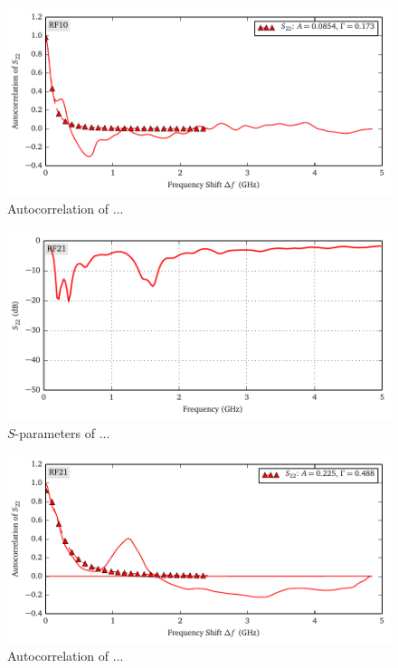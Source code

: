 \begin{figure}
 \centering
 \includegraphics{figs/active/RF10-autoCorrelation.pdf}
 \caption{Autocorrelation of ...}
\end{figure}

\begin{figure}
 \centering
 \includegraphics{figs/active/RF21-sParameters.pdf}
 \caption{$S$-parameters of ...}
\end{figure}

\begin{figure}
 \centering
 \includegraphics{figs/active/RF21-autoCorrelation.pdf}
 \caption{Autocorrelation of ...}
\end{figure}

